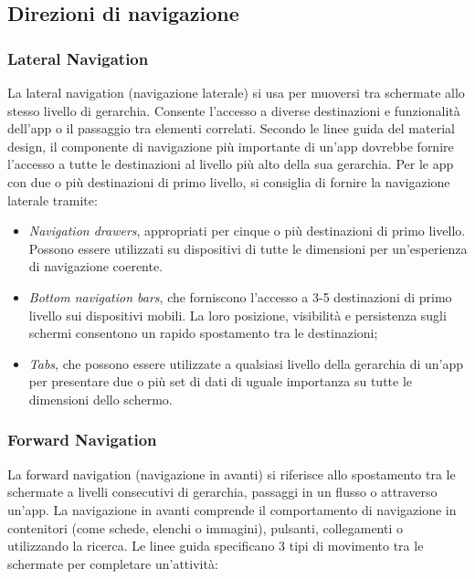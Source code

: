 \documentclass[12pt, a4paper]{report}
\begin{document}
            \subsection{Direzioni di navigazione}

                \subsubsection{Lateral Navigation}
    			La lateral navigation (navigazione laterale) si usa per muoversi tra schermate allo stesso livello di gerarchia. Consente l'accesso a diverse destinazioni e funzionalità dell'app
    			o il passaggio tra elementi correlati. Secondo le linee guida del material design, il componente di navigazione più importante di un'app dovrebbe fornire
    			l'accesso a tutte le destinazioni al livello più alto della sua gerarchia. Per le app con due o più destinazioni di primo livello, si consiglia di fornire la
    			navigazione laterale tramite:

    			\begin{itemize}
    				\item \textit{Navigation drawers}, appropriati per cinque o più destinazioni di primo livello. Possono essere utilizzati su dispositivi di tutte le dimensioni
    				per un'esperienza di navigazione coerente.
    				\item \textit{Bottom navigation bars},  che forniscono l'accesso a 3-5 destinazioni di primo livello sui dispositivi mobili. La loro posizione, visibilità
    				e persistenza sugli schermi consentono un rapido spostamento tra le destinazioni;
    				\item \textit{Tabs}, che possono essere utilizzate a qualsiasi livello della gerarchia di un'app per presentare due o più set di dati di uguale importanza
    				su tutte le dimensioni dello schermo.
    			\end{itemize}


    			\subsubsection{Forward Navigation}
    			La forward navigation (navigazione in avanti) si riferisce allo spostamento tra le schermate a livelli consecutivi di gerarchia, passaggi in un flusso o
    			attraverso un'app. La navigazione in avanti comprende il comportamento di navigazione in contenitori (come schede, elenchi o immagini), pulsanti, collegamenti
    			o utilizzando la ricerca. Le linee guida specificano 3 tipi di movimento tra le schermate per completare un'attività:
\end{document}
